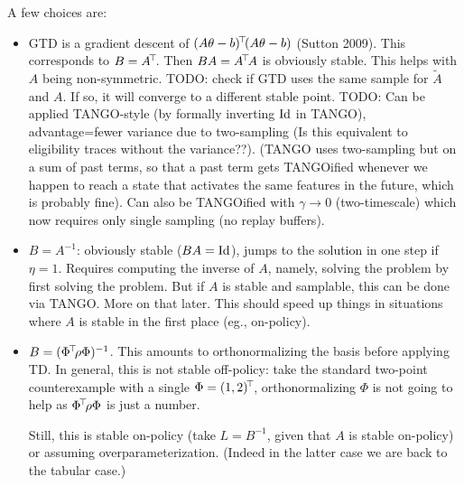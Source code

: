 \documentclass[11pt,a4paper]{article}
\begin{document}
A few choices are:
\begin{itemize}
\item GTD is a gradient descent of
$(A\theta-b)^{\!\top}\!(A\theta-b)$ (Sutton 2009).
This corresponds to $B=A^{\!\top}\!$. Then
$BA=A^{\!\top}\!A$ is
obviously stable. This helps with $A$ being non-symmetric. TODO: check if
GTD uses the same sample for $\tilde{A}$ and $A$. If so, it will
converge to a different stable point. TODO: Can be applied TANGO-style
(by formally inverting $\operatorname{Id}$ in TANGO), advantage=fewer variance due to
two-sampling (Is this equivalent to eligibility traces without the
variance??). (TANGO uses two-sampling but on a sum of past terms, so
that a past term gets TANGOified whenever we happen to reach a state that
activates the same features in the future, which is probably fine). Can
also be TANGOified with $\gamma\to 0$ (two-timescale) which now requires
only single sampling (no replay buffers).

\item $B=A^{-1}$: obviously stable ($BA=\operatorname{Id}$), jumps to the solution in one step if
$\eta=1$. Requires computing the inverse of $A$, namely, solving the
problem by first solving the problem. But if $A$ is stable and samplable,
this can be done via TANGO. More on that later. This should speed up
things in situations where $A$ is stable in the first place (eg.,
on-policy).

\item $B=(\Phi^{\!\top}\!\rho\Phi)^{-1}$. This amounts to orthonormalizing
the basis before applying TD. In general, this is not stable off-policy: take the
standard two-point counterexample with a single $\Phi=(1,2)^{\!\top}\!$,
orthonormalizing $\Phi$ is not going to help as $\Phi^{\!\top}\!\rho\Phi$
is just a number.

Still, this is stable
on-policy (take $L=B^{-1}$, given that $A$ is stable on-policy) or assuming overparameterization. (Indeed in the latter case we
are back to the tabular case.)


\end{itemize}
\end{document}
